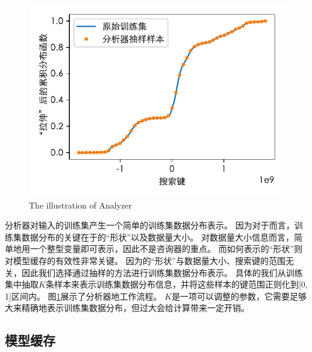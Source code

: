 \begin{figure}[!htp]
  \centering
  \includegraphics{figure/analyzer.pdf}
    {The illustration of Analyzer}
  \label{fig:analyzer}
\end{figure}

分析器对输入的训练集产生一个简单的训练集数据分布表示。
因为对于{\li}而言，训练集数据分布的关键在于{\cdf}的“形状”以及数据量大小。
对数据量大小信息而言，简单地用一个整型变量即可表示，因此不是咨询器的重点。
而如何表示{\cdf}的“形状”则对模型缓存的有效性非常关键。
因为{\cdf}的“形状”与数据量大小、搜索键的范围无关，因此我们选择通过抽样的方法进行训练集数据分布表示。
具体的我们从训练集中抽取$K$条样本来表示训练集数据分布信息，并将这些样本的键范围正则化到[0, 1]区间内。
图\ref{fig:analyzer}展示了分析器地工作流程。
$K$是一项可以调整的参数，它需要足够大来精确地表示训练集数据分布，但过大会给计算带来一定开销。


\subsection{模型缓存}

